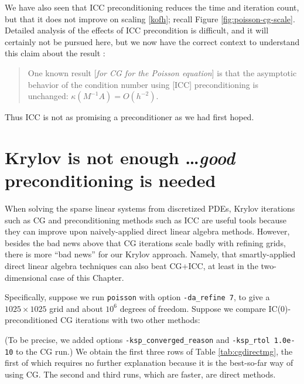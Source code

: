 We have also seen that ICC preconditioning reduces the time and iteration count, but that it does not improve on scaling \eqref{kofh}; recall Figure \ref{fig:poisson-cg-scale}.  Detailed analysis of the effects of ICC precondition is difficult, and it will certainly not be pursued here, but we now have the correct context to understand this claim about the result \citet[][p.~82]{Elmanetal2005}:
\begin{quote}
One known result [\emph{for CG for the Poisson equation}] is that the asymptotic behavior of the condition number using [ICC] preconditioning is unchanged: $\kappa(M^{-1} A) = O(h^{-2})$.
\end{quote}
Thus ICC is not as promising a preconditioner as we had first hoped.


\section{Krylov is not enough \dots \emph{good} preconditioning is needed}

When solving the sparse linear systems from discretized PDEs, Krylov iterations such as CG and preconditioning methods such as ICC are useful tools because they can improve upon naively-applied direct linear algebra methods.  However, besides the bad news above that CG iterations scale badly with refining grids, there is more ``bad news'' for our Krylov approach.  Namely, that smartly-applied direct linear algebra techniques can also beat CG+ICC, at least in the two-dimensional case of this Chapter.

Specifically, suppose we run \texttt{poisson} with option \texttt{-da\_refine 7}, to give a $1025 \times 1025$ grid and about $10^6$ degrees of freedom.  Suppose we compare IC($0$)-preconditioned CG iterations with two other methods:
(To be precise, we added options \texttt{-ksp\_converged\_reason} and \texttt{-ksp\_rtol 1.0e-10} to the CG run.)  We obtain the first three rows of Table \ref{tab:cgdirectmg}, the first of which requires no further explanation because it is the best-so-far way of using CG.  The second and third runs, which are faster, are direct methods.

